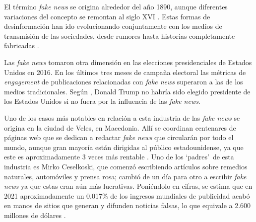 \label{sec:intro}
El término \emph{fake news} se origina alrededor del año 1890, aunque diferentes variaciones del concepto se remontan al siglo XVI \citep{MerriamWebster}. Estas formas de desinformación han ido evolucionando conjuntamente con los medios de transmisión de las sociedades, desde rumores hasta historias completamente fabricadas \citep{Soll2016}.

Las \emph{fake news} tomaron otra dimensión en las elecciones presidenciales de Estados Unidos en 2016. En los últimos tres meses de campaña electoral las métricas de \emph{engagement} de publicaciones relacionadas con \emph{fake news} superaron a las de los medios tradicionales. Según \citet{Parkinson2016,Read2016,Dewey2014}, Donald Trump no habría sido elegido presidente de los Estados Unidos si no fuera por la influencia de las \emph{fake news}. 

Uno de los casos más notables en relación a esta industria de las \emph{fake news} se origina en la ciudad de Veles, en Macedonia. Allí se coordinan centenares de páginas web que se dedican a redactar \emph{fake news} que circularán por todo el mundo, aunque gran mayoría están dirigidas al público estadounidense, ya que este es aproximadamente 3 veces más rentable \citep{Subramanian2017}. Uno de los `padres'\ de esta industria es Mirko Ceselkoski, que comenzó escribiendo artículos sobre remedios naturales, automóviles y prensa rosa; cambió de un día para otro a escribir \emph{fake news} ya que estas eran aún más lucrativas. Poniéndolo en cifras, se estima que en 2021 aproximadamente un 0.017\% de los ingresos mundiales de publicidad acabó en manos de sitios que generan y difunden noticias falsas, lo que equivale a 2.600 millones de dólares \citep{Skibinski2022}.


